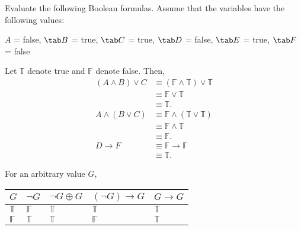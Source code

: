 \documentclass{article}
\begin{document}
Evaluate the following Boolean formulas. Assume that the variables have the following values:
\begin{center}
$A$ = false, $\tab B$ = true, $\tab C$ = true, $\tab D$ = false, $\tab E$ = true, $\tab F$ = false
\end{center}

Let $\mathbb{T}$ denote true and $\mathbb{F}$ denote false. Then,
\begin{align*}
(A \wedge B) \vee C &\equiv (\mathbb{F} \wedge \mathbb{T}) \vee \mathbb{T}\\
&\equiv \mathbb{F} \vee \mathbb{T}\\
&\equiv \mathbb{T}.\\
A \wedge (B \vee C) &\equiv \mathbb{F} \wedge (\mathbb{T} \vee \mathbb{T})\\
&\equiv \mathbb{F} \wedge \mathbb{T}\\
&\equiv \mathbb{F}.\\
D \rightarrow F &\equiv \mathbb{F} \rightarrow \mathbb{F}\\
&\equiv \mathbb{T}.
\end{align*}

For an arbitrary value $G$, 

\begin{center}
\begin{tabular}{ | l | l | l | l | l | }
\hline
\textbf{$G$} & \textbf{$\neg G$} & \textbf{$\neg G \oplus G$} & \textbf{$(\neg G) \rightarrow G$} & \textbf{$G \rightarrow G$}\\
\hline
$\mathbb{T}$ & $\mathbb{F}$  & $\mathbb{T}$ & $\mathbb{T}$ & $\mathbb{T}$\\
\hline
$\mathbb{F}$ & $\mathbb{T}$  & $\mathbb{T}$ & $\mathbb{F}$ & $\mathbb{T}$\\
\hline
\end{tabular}
\end{center}
\end{document}

